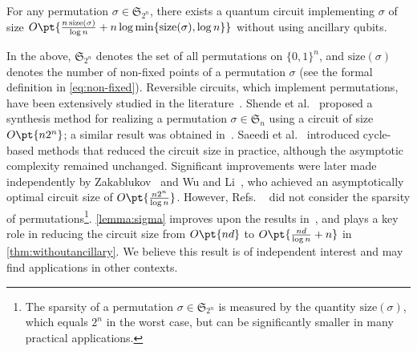 \documentclass[a4paper,UKenglish,cleveref, autoref, thm-restate]{lipics-v2021}
\DeclarePairedDelimiter\cbra{\{}{\}}
\newcommand{\bo}{O\pt}
\begin{document}
\begin{lemma}\label{lemma:sigma}
For any permutation $\sigma \in \mathfrak{S}_{2^n}$, there exists a quantum circuit implementing $\sigma$ of size $\bo{\frac{n\,\mathrm{size}(\sigma)}{\log n} + n\log\min\cbra{\mathrm{size}(\sigma), \log n}}$ without using ancillary qubits. 
\end{lemma}

In the above, $\mathfrak{S}_{2^n}$ denotes the set of all permutations on $\{0, 1\}^n$, and $\mathrm{size}(\sigma)$ denotes the number of non-fixed points of a permutation $\sigma$ (see the formal definition in \cref{eq:non-fixed}).  
Reversible circuits, which implement permutations, have been extensively studied in the literature~\cite{shende2003synthesis, brodsky2004reversible, wille2009bdd, saeedi2010reversible, saeedi2010library, saeedi2013synthesis, abdessaied2014upper, zakablukov2017asymptotic, li2023asymptotically, markov2008optimal, jiang2020optimal}.  
Shende et al.~\cite{shende2003synthesis} proposed a synthesis method for realizing a permutation $\sigma \in \mathfrak{S}_n$ using a circuit of size $\bo{n2^n}$; a similar result was obtained in~\cite{brodsky2004reversible}.  
Saeedi et al.~\cite{saeedi2010reversible, saeedi2010library} introduced cycle-based methods that reduced the circuit size in practice, although the asymptotic complexity remained unchanged.  
Significant improvements were later made independently by Zakablukov~\cite{zakablukov2017asymptotic} and  Wu and Li~\cite{li2023asymptotically}, who achieved an asymptotically optimal circuit size of $\bo{\frac{n2^n}{\log n}}$.  
However,  Refs. ~\cite{zakablukov2017asymptotic,li2023asymptotically} did not consider the sparsity of permutations\footnote{The sparsity of a permutation $\sigma \in \mathfrak{S}_{2^n}$ is measured by the quantity $\mathrm{size}(\sigma)$, which equals $2^n$ in the worst case, but can be significantly smaller in many practical applications.}.  
\cref{lemma:sigma} improves upon the results in~\cite{zakablukov2017asymptotic, li2023asymptotically}, and plays a key role in reducing the circuit size from $\bo{nd}$ to $\bo{\frac{nd}{\log n} + n}$ in \cref{thm:withoutancillary}. We believe this result is of independent interest and may find applications in other contexts.

 
\end{document}
